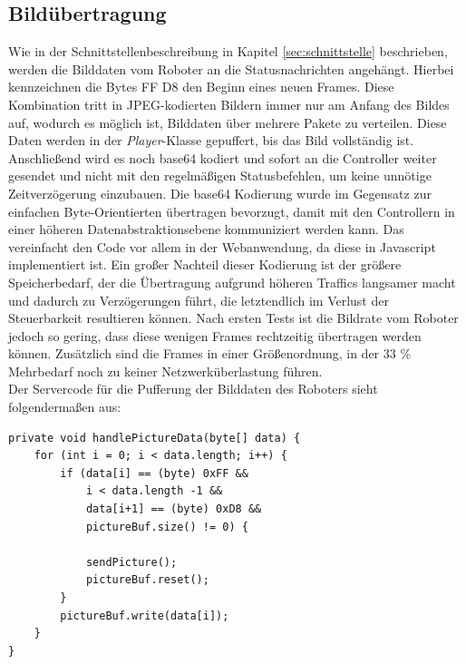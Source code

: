 \subsection{Bildübertragung}
Wie in der Schnittstellenbeschreibung in Kapitel \ref{sec:schnittstelle} beschrieben, werden die Bilddaten vom Roboter an die Statusnachrichten angehängt. Hierbei kennzeichnen die Bytes FF D8 den Beginn eines neuen Frames. Diese Kombination tritt in JPEG-kodierten Bildern immer nur am Anfang des Bildes auf, wodurch es möglich ist, Bilddaten über mehrere Pakete zu verteilen. Diese Daten werden in der \textit{Player}-Klasse gepuffert, bis das Bild vollständig ist. Anschließend wird es noch base64 kodiert und sofort an die Controller weiter gesendet und nicht mit den regelmäßigen Statusbefehlen, um keine unnötige Zeitverzögerung einzubauen. Die base64 Kodierung wurde im Gegensatz zur einfachen Byte-Orientierten übertragen bevorzugt, damit mit den Controllern in einer höheren Datenabstraktionsebene kommuniziert werden kann. Das vereinfacht den Code vor allem in der Webanwendung, da diese in Javascript implementiert ist. Ein großer Nachteil dieser Kodierung ist der größere Speicherbedarf, der die Übertragung aufgrund höheren Traffics langsamer macht und dadurch zu Verzögerungen führt, die letztendlich im Verlust der Steuerbarkeit resultieren können. Nach ersten Tests ist die Bildrate vom Roboter jedoch so gering, dass diese wenigen Frames rechtzeitig übertragen werden können. Zusätzlich sind die Frames in einer Größenordnung, in der 33 \% Mehrbedarf noch zu keiner Netzwerküberlastung führen.\\ Der Servercode für die Pufferung der Bilddaten des Roboters sieht folgendermaßen aus:

\begin{lstlisting}
private void handlePictureData(byte[] data) {
	for (int i = 0; i < data.length; i++) {
		if (data[i] == (byte) 0xFF && 
			i < data.length -1 && 
			data[i+1] == (byte) 0xD8 && 
			pictureBuf.size() != 0) {
			
			sendPicture();
			pictureBuf.reset();
		}
		pictureBuf.write(data[i]);
	}
}
\end{lstlisting}



